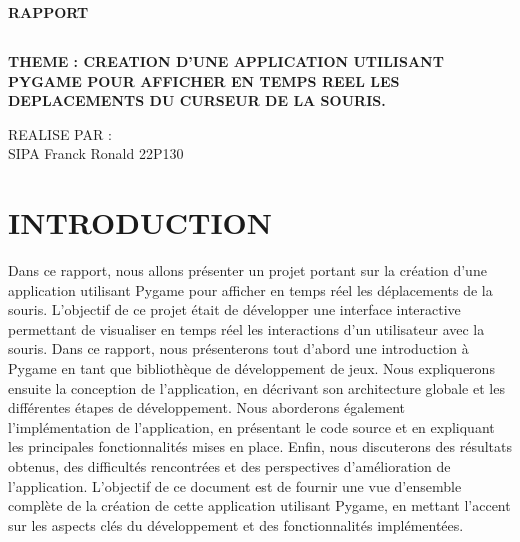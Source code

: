 \documentclass[a4paper, 12px]{article}
\begin{document}

\begin{center}
\Huge  {\bfseries RAPPORT} \\

\begin{mybox}
\section*{}
   \bfseries  {\huge THEME : CREATION D'UNE APPLICATION UTILISANT PYGAME POUR AFFICHER EN TEMPS REEL LES DEPLACEMENTS DU CURSEUR DE LA SOURIS.}
\\
\end{mybox}


\large REALISE PAR : \\

\LARGE SIPA Franck Ronald 22P130\\

\end{center}



\newpage

\tableofcontents

\newpage

\section{INTRODUCTION}

\par Dans ce rapport, nous allons présenter un projet portant sur la création d'une application utilisant Pygame pour afficher en temps réel les déplacements de la souris. L'objectif de ce projet était de développer une interface interactive permettant de visualiser en temps réel les interactions d’un utilisateur avec la souris. Dans ce rapport, nous présenterons tout d'abord une introduction à Pygame en tant que bibliothèque de développement de jeux. Nous expliquerons ensuite la conception de l'application, en décrivant son architecture globale et les différentes étapes de développement. Nous aborderons également l'implémentation de l'application, en présentant le code source et en expliquant les principales fonctionnalités mises en place. Enfin, nous discuterons des résultats obtenus, des difficultés rencontrées et des perspectives d'amélioration de l'application. L'objectif de ce document est de fournir une vue d'ensemble complète de la création de cette application utilisant Pygame, en mettant l'accent sur les aspects clés du développement et des fonctionnalités implémentées.
\end{document}
